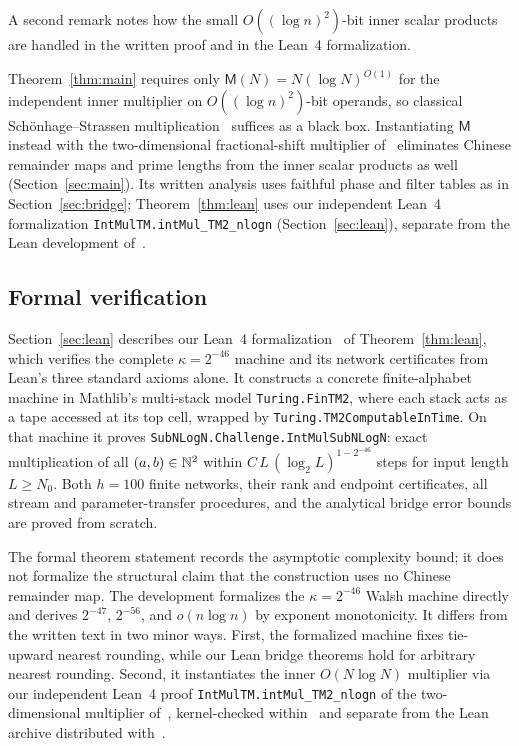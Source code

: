 A second remark notes how the small $O((\log n)^2)$-bit inner scalar products are handled in the written proof and in the Lean~4 formalization.

\begin{remark}\label{rem:intro-inner}
Theorem~\ref{thm:main} requires only $\mathsf M(N)=N(\log N)^{O(1)}$ for the independent inner multiplier on $O((\log n)^2)$-bit operands, so classical Sch\"onhage--Strassen multiplication~\cite{SS71} suffices as a black box. Instantiating $\mathsf M$ instead with the two-dimensional fractional-shift multiplier of~\cite{MS} eliminates Chinese remainder maps and prime lengths from the inner scalar products as well (Section~\ref{sec:main}). Its written analysis uses faithful phase and filter tables as in Section~\ref{sec:bridge}; Theorem~\ref{thm:lean} uses our independent Lean~4 formalization \texttt{IntMulTM.\allowbreak intMul\_\allowbreak TM2\_\allowbreak nlogn} (Section~\ref{sec:lean}), separate from the Lean development of~\cite{MS}.
\end{remark}

\subsection{Formal verification}\label{sec:overview-lean}

Section~\ref{sec:lean} describes our Lean~4 formalization~\cite{Lean26} of Theorem~\ref{thm:lean}, which verifies the complete $\kappa=2^{-46}$ machine and its network certificates from Lean's three standard axioms alone. It constructs a concrete finite-alphabet machine in Mathlib's multi-stack model \texttt{Turing.FinTM2}, where each stack acts as a tape accessed at its top cell, wrapped by \texttt{Turing.TM2ComputableInTime}. On that machine it proves \texttt{SubNLogN.Challenge.IntMulSubNLogN}: exact multiplication of all $(a,b)\in\mathbb{N}^2$ within $C\,L\,(\log_2 L)^{1-2^{-46}}$ steps for input length $L\ge N_0$. Both $h=100$ finite networks, their rank and endpoint certificates, all stream and parameter-transfer procedures, and the analytical bridge error bounds are proved from scratch.

The formal theorem statement records the asymptotic complexity bound; it does not formalize the structural claim that the construction uses no Chinese remainder map. The development formalizes the $\kappa=2^{-46}$ Walsh machine directly and derives $2^{-47}$, $2^{-56}$, and $o(n\log n)$ by exponent monotonicity. It differs from the written text in two minor ways. First, the formalized machine fixes tie-upward nearest rounding, while our Lean bridge theorems hold for arbitrary nearest rounding. Second, it instantiates the inner $O(N\log N)$ multiplier via our independent Lean~4 proof \texttt{IntMulTM.\allowbreak intMul\_\allowbreak TM2\_\allowbreak nlogn} of the two-dimensional multiplier of~\cite{MS}, kernel-checked within~\cite{Lean26} and separate from the Lean archive distributed with~\cite{MS}.

\normalsize
\setlength{\floatsep}{12.0pt plus 2.0pt minus 2.0pt}
\setlength{\textfloatsep}{20.0pt plus 2.0pt minus 4.0pt}
\setlength{\intextsep}{12.0pt plus 2.0pt minus 2.0pt}
